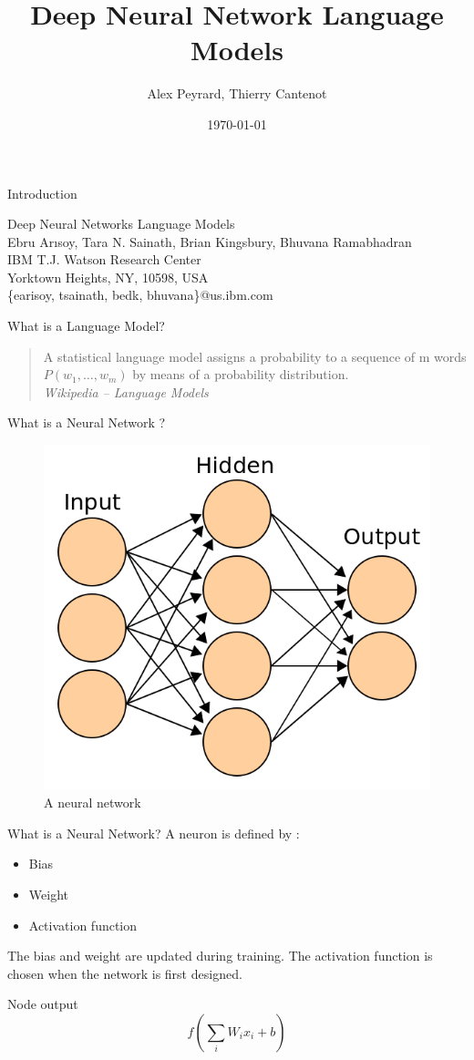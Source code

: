 \documentclass{beamer}
\title[DNNLM]{Deep Neural Network Language Models}
\author[A. Peyrard, T. Cantenot]{Alex Peyrard, Thierry Cantenot}
\institute{Shanghai JiaoTong University}
\date{\today}
\begin{document}
\begin{frame}[plain]
	  \titlepage
\end{frame}

\begin{frame}{Introduction}
	\begin{center}
		Deep Neural Networks Language Models\\
		Ebru Arısoy, Tara N. Sainath, Brian Kingsbury, Bhuvana Ramabhadran\\
		IBM T.J. Watson Research Center\\
		Yorktown Heights, NY, 10598, USA\\
		\{earisoy, tsainath, bedk, bhuvana\}@us.ibm.com
	\end{center}
\end{frame}

\begin{frame}{What is a Language Model?}
	\begin{quote}
		A statistical language model assigns a probability to a sequence of m words $P(w_1,\ldots,w_m)$ by means of a probability distribution. \\ \flushright\emph{Wikipedia -- Language Models}
	\end{quote}
\end{frame}

\begin{frame}{What is a Neural Network ?}
\begin{figure}[!ht]
	\centering
	\rule{0cm}{0cm}
    \includegraphics[width=0.5\linewidth]{./images/ANN.png}
	\caption{A neural network}
\end{figure}
\end{frame}

\begin{frame}{What is a Neural Network?}
	A neuron is defined by :
	\begin{itemize}
		\item Bias
		\item Weight
		\item Activation function
	\end{itemize}
	\vspace{5mm}
	The bias and weight are updated during training. The activation function is chosen when the network is first designed.
	\begin{exampleblock}{Node output}
	\[f(\sum\limits_{i}W_{i}x_{i} + b)\]
	\end{exampleblock}
\end{frame}
\end{document}
